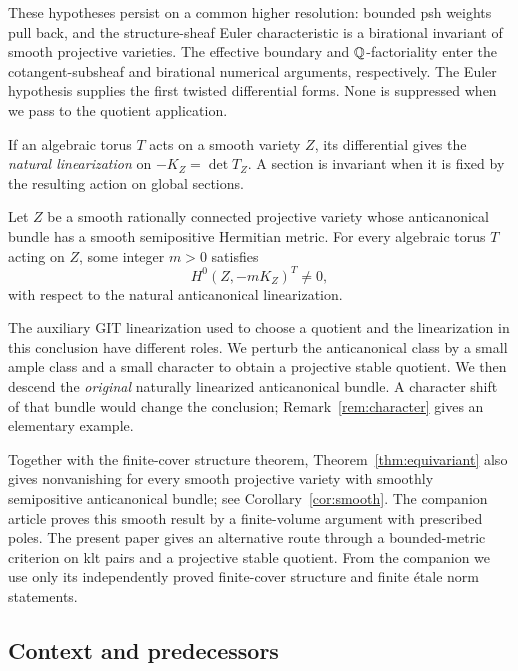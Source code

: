 These hypotheses persist on a common higher resolution: bounded psh weights pull back, and the structure-sheaf Euler characteristic is a birational invariant of smooth projective varieties. The effective boundary and $\mathbb Q$-factoriality enter the cotangent-subsheaf and birational numerical arguments, respectively. The Euler hypothesis supplies the first twisted differential forms. None is suppressed when we pass to the quotient application.

If an algebraic torus $T$ acts on a smooth variety $Z$, its differential gives the \emph{natural linearization} on $-K_Z=\det T_Z$. A section is invariant when it is fixed by the resulting action on global sections.

\begin{theorem}\label{thm:equivariant}
Let $Z$ be a smooth rationally connected projective variety whose anticanonical bundle has a smooth semipositive Hermitian metric. For every algebraic torus $T$ acting on $Z$, some integer $m>0$ satisfies
\[
H^0(Z,-mK_Z)^T\ne0,
\]
with respect to the natural anticanonical linearization.
\end{theorem}

The auxiliary GIT linearization used to choose a quotient and the
linearization in this conclusion have different roles. We perturb the anticanonical class by a small ample class and a small character to obtain a projective stable quotient. We then descend the \emph{original} naturally linearized anticanonical bundle. A character shift of that bundle would change the conclusion; Remark~\ref{rem:character} gives an elementary example.

Together with the finite-cover structure theorem, Theorem~\ref{thm:equivariant} also gives nonvanishing for every smooth projective variety with smoothly semipositive anticanonical bundle; see Corollary~\ref{cor:smooth}. The companion article \cite{SmoothCompanion} proves this smooth result by a finite-volume argument with prescribed poles. The present paper gives an alternative route through a bounded-metric criterion on klt pairs and a projective stable quotient. From the companion we use only its independently proved finite-cover structure and finite \'etale norm statements.

\subsection{Context and predecessors}

